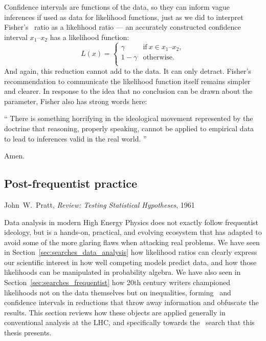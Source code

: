 Confidence intervals are functions of the data, so they can inform vague
inferences if used as data for likelihood functions, just as we did to
interpret Fisher's \pvalue\ ratio as a likelihood ratio ---
an accurately constructed confidence interval $x_1\textrm{--}x_2$ has a
likelihood function:
\begin{equation}
L(x) =
\left\{
\begin{matrix}
\gamma & \textrm{if}~x \in x_1\textrm{--}x_2, \\
1 - \gamma & \textrm{otherwise.} \\
\end{matrix}
\right.
\end{equation}
And again, this reduction cannot add to the data.
It can only detract.
Fisher's recommendation to communicate the likelihood function itself
remains simpler and clearer.
In response to the idea that no conclusion can be drawn about the parameter,
Fisher also has strong words here:
\begin{displayquote}
\small
``%
There is something horrifying in the ideological movement represented by the
doctrine that reasoning, properly speaking, cannot be applied to empirical data
to lead to inferences valid in the real world.%
''~\cite{fisher1956statistical}
\end{displayquote}
Amen.

\begin{singlespacing}
\section{Post-frequentist practice}
\label{sec:searches_practice}
\begin{epigraphs}
%
{John~W.~Pratt,
\textit{Review: Testing Statistical Hypotheses},
1961~\cite{pratt1961testing}}
\end{epigraphs}
\end{singlespacing}

Data analysis in modern High Energy Physics does not exactly follow frequentist
ideology, but is a hands-on, practical, and evolving ecosystem that has adapted
to avoid some of the more glaring flaws when attacking real problems.
We have seen in Section~\ref{sec:searches_data_analysis} how likelihood ratios
can clearly express our scientific interest in how well competing models
predict data, and how those likelihoods can be manipulated in probability
algebra.
We have also seen in Section~\ref{sec:searches_frequentist} how 20th century
writers championed likelihoods not on the data themselves but on inequalities,
forming \pvalues\ and confidence intervals in reductions that throw away
information and obfuscate the results.
This section reviews how these objects are applied generally in conventional
analysis at the LHC, and specifically towards the \atlas\ search that this
thesis presents.

